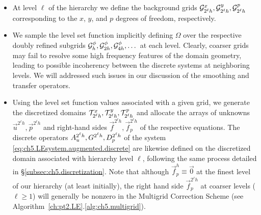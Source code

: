 \begin{itemize}

\item At level $\ell$ of the hierarchy we define the background grids $\mathcal{G}^x_{2^{\ell}h}, \mathcal{G}^y_{2^{\ell}h}, \mathcal{G}^p_{2^{\ell}h}$ corresponding to the $x$, $y$, and $p$ degrees of freedom, respectively.

\item We sample the level set function implicitly defining $\Omega$ over the respective doubly refined subgrids $\mathcal{G}^\phi_h, \mathcal{G}^\phi_{2h}, \mathcal{G}^\phi_{4h}, \dotsc$ at each level. Clearly, coarser grids may fail to resolve some high frequency features of the domain geometry, leading to possible incoherency between the discrete systems at neighboring levels. We will addressed such issues in our discussion of the smoothing and transfer operators.

\item Using the level set function values associated with a given grid, we generate the discretized domains $\mathcal{T}^x_{2^{\ell}h}, \mathcal{T}^y_{2^{\ell}h}, \mathcal{T}^p_{2^{\ell}h}$ and allocate the arrays of unknowns $\vec{u}^{2^{\ell}h}, \vec{p}^{2^{\ell}h}$ and right-hand sides $\vec{f}^{2^{\ell}h}, \vec{f}_p^{2^{\ell}h}$ of the respective equations. The discrete operators $A_u^{2^{\ell}h}, \linebreak[0] G^{2^{\ell}h}, \linebreak[0] D_p^{2^{\ell}h}$ of the system \eqref{eq:ch5.LEsystem.augmented.discrete} are likewise defined on the discretized domain associated with hierarchy level $\ell$, following the same process detailed in \S\ref{subsec:ch5.discretization}. Note that although $\vec{f}_p^h \equiv \vec{0}$ at the finest level of our hierarchy (at least initially), the right hand side $\vec{f}_p^{2^{\ell}h}$ at coarser levels ($\ell \geq 1$) will generally be nonzero in the Multigrid Correction Scheme (see Algorithm~\ref{ch:pt2.LE}.\ref{alg:ch5.multigrid}).

\end{itemize}


